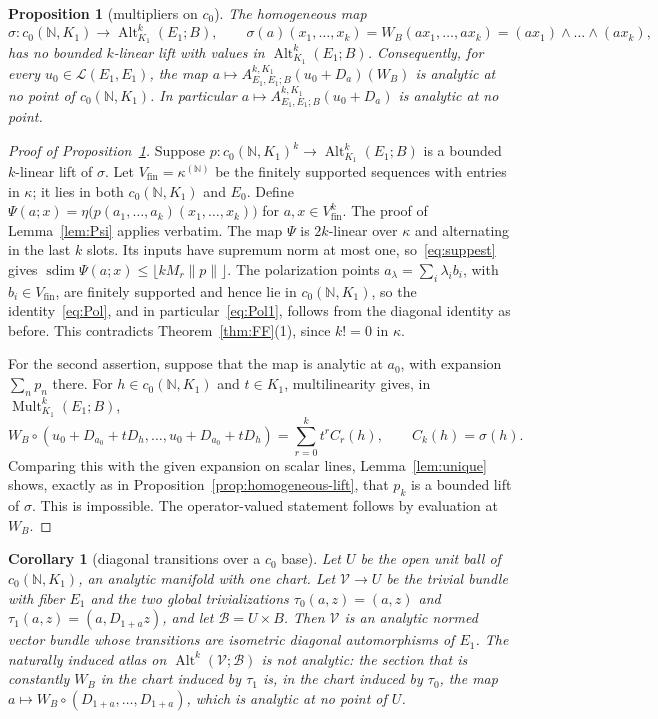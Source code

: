 \documentclass[11pt]{amsart}
\newtheorem{proposition}[theorem]{Proposition}
\newtheorem{corollary}[theorem]{Corollary}
\theoremstyle{definition}
\theoremstyle{remark}
\numberwithin{equation}{section}
\newcommand{\N}{\mathbb N}
\newcommand{\cL}{\mathcal L}
\newcommand{\Alt}{\operatorname{Alt}}
\newcommand{\Mult}{\operatorname{Mult}}
\newcommand{\norm}[1]{\lVert #1\rVert}
\newcommand{\sdim}{\operatorname{sdim}}
\begin{document}
\begin{proposition}[multipliers on $c_0$]\label{lau:prop:c0-multipliers}
The homogeneous map
\[
 \sigma\colon c_0(\N,K_1)\to\Alt^k_{K_1}(E_1;B),\qquad
 \sigma(a)(x_1,\dots,x_k)=W_B(ax_1,\dots,ax_k)=(ax_1)\wedge\dots\wedge(ax_k),
\]
has no bounded $k$\nobreakdash-linear lift with values in $\Alt^k_{K_1}(E_1;B)$. Consequently, for every
$u_0\in\cL(E_1,E_1)$, the map $a\mapsto A^{k,K_1}_{E_1,E_1;B}(u_0+D_a)(W_B)$ is analytic at no point of $c_0(\N,K_1)$. In
particular $a\mapsto A^{k,K_1}_{E_1,E_1;B}(u_0+D_a)$ is analytic at no point.
\end{proposition}



\begin{proof}[Proof of Proposition~\ref{lau:prop:c0-multipliers}]
Suppose $p\colon c_0(\N,K_1)^k\to\Alt^k_{K_1}(E_1;B)$ is a bounded $k$\nobreakdash-linear lift of $\sigma$. Let
$V_{\mathrm{fin}}=\kappa^{(\N)}$ be the finitely supported sequences with entries in $\kappa$; it lies in both $c_0(\N,K_1)$
and $E_0$. Define $\Psi(a;x)=\eta\bigl(p(a_1,\dots,a_k)(x_1,\dots,x_k)\bigr)$ for $a,x\in V_{\mathrm{fin}}^k$. The proof of
Lemma~\ref{lem:Psi} applies verbatim. The map $\Psi$ is $2k$\nobreakdash-linear over $\kappa$ and alternating in the last
$k$ slots. Its inputs have supremum norm at most one, so~\eqref{eq:suppest} gives
$\sdim\Psi(a;x)\le\lfloor kM_r\norm p\rfloor$. The polarization points $a_\lambda=\sum_i\lambda_ib_i$, with
$b_i\in V_{\mathrm{fin}}$, are finitely supported and hence lie in $c_0(\N,K_1)$, so the identity~\eqref{eq:Pol}, and in
particular~\eqref{eq:Pol1}, follows from the diagonal identity as before. This contradicts Theorem~\ref{thm:FF}(1), since
$k!=0$ in $\kappa$.

For the second assertion, suppose that the map is analytic at $a_0$, with expansion $\sum_n p_n$ there. For
$h\in c_0(\N,K_1)$ and $t\in K_1$, multilinearity gives, in $\Mult^k_{K_1}(E_1;B)$,
\[
 W_B\circ(u_0+D_{a_0}+tD_h,\dots,u_0+D_{a_0}+tD_h)=\sum_{r=0}^kt^rC_r(h),\qquad C_k(h)=\sigma(h).
\]
Comparing this with the given expansion on scalar lines, Lemma~\ref{lem:unique} shows, exactly as in
Proposition~\ref{prop:homogeneous-lift}, that $p_k$ is a bounded lift of $\sigma$. This is impossible. The operator-valued
statement follows by evaluation at $W_B$.
\end{proof}

\begin{corollary}[diagonal transitions over a $c_0$ base]\label{lau:cor:diagonal-bundle}
Let $U$ be the open unit ball of $c_0(\N,K_1)$, an analytic manifold with one chart. Let $\mathcal V\to U$ be the
trivial bundle with fiber $E_1$ and the two global trivializations $\tau_0(a,z)=(a,z)$ and $\tau_1(a,z)=(a,D_{1+a}z)$,
and let $\mathcal B=U\times B$. Then $\mathcal V$ is an analytic normed vector bundle whose transitions are isometric
diagonal automorphisms of $E_1$. The naturally induced atlas on $\Alt^k(\mathcal V;\mathcal B)$ is not analytic: the section
that is constantly $W_B$ in the chart induced by $\tau_1$ is, in the chart induced by $\tau_0$, the map
$a\mapsto W_B\circ(D_{1+a},\dots,D_{1+a})$, which is analytic at no point of $U$.
\end{corollary}
\end{document}
